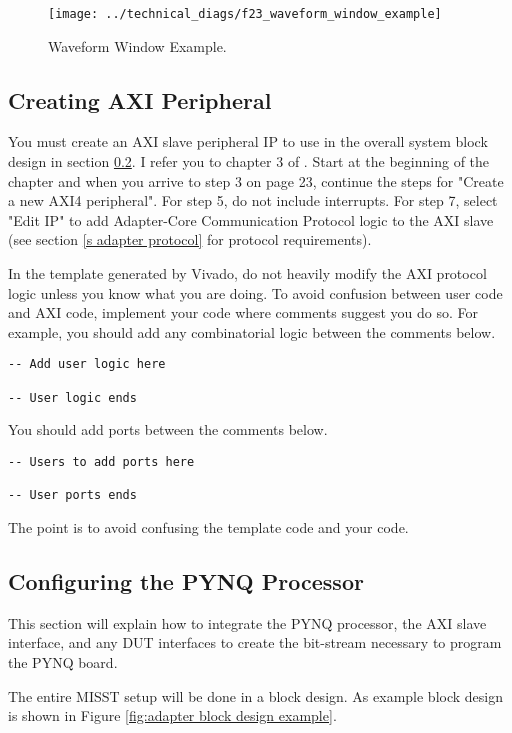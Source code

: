\documentclass[]{report}
\begin{document}
\begin{figure}[h]
	\centering
	\texttt{[image: ../technical\_diags/f23\_waveform\_window\_example]}
	\caption{Waveform Window Example.}
	\label{fig:wave form window example}
\end{figure}

\subsection{Creating AXI Peripheral}
\label{ss creating axi ip}
You must create an AXI slave peripheral IP to use in the overall system block design in section \ref{ss configurating pynq processor}. I refer you to chapter 3 of \cite{creating ip}. Start at the beginning of the chapter and when you arrive to step 3 on page 23, continue the steps for "Create a new AXI4 peripheral". For step 5, do not include interrupts. For step 7, select "Edit IP" to add Adapter-Core Communication Protocol logic to the AXI slave (see section \ref{s adapter protocol} for protocol requirements).  

In the template generated by Vivado, do not heavily modify the AXI protocol logic unless you know what you are doing. To avoid confusion between user code and AXI code, implement your code where comments suggest you do so. For example, you should add any combinatorial logic between the comments below.
\begin{verbatim}
-- Add user logic here

-- User logic ends
\end{verbatim}
You should add ports between the comments below.
\begin{verbatim}
-- Users to add ports here

-- User ports ends
\end{verbatim}
The point is to avoid confusing the template code and your code.

\subsection{Configuring the PYNQ Processor}
\label{ss configurating pynq processor}

This section will explain how to integrate the PYNQ processor, the AXI slave interface, and any DUT interfaces to create the bit-stream necessary to program the PYNQ board.

The entire MISST setup will be done in a block design. As example block design is shown in Figure \ref{fig:adapter block design example}.
\end{document}
